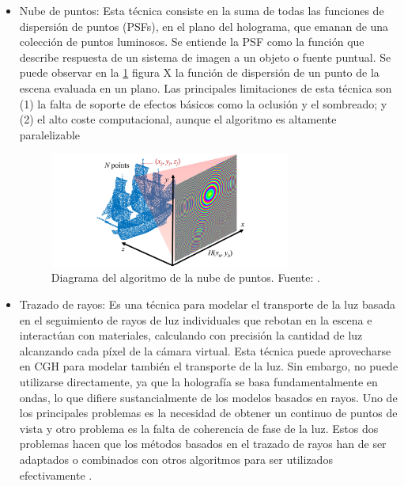\documentclass[10pt, a4paper]{article}
\begin{document}
\begin{itemize}
\item Nube de puntos: Esta técnica consiste en la suma de todas las funciones de dispersión de puntos (PSFs), en el plano del holograma, que emanan de una colección de puntos luminosos. Se entiende la PSF como la función que describe respuesta de un sistema de imagen a un objeto o fuente puntual. Se puede observar en la \ref{fig:nube} figura X la función de dispersión de un punto de la escena evaluada en un plano. Las principales limitaciones de esta técnica son (1) la falta de soporte de efectos básicos como la oclusión y el sombreado; y (2) el alto coste computacional, aunque el algoritmo es altamente paralelizable \cite{Blinder:2021}

\begin{figure}[h]
    \centering 
    \includegraphics[width=0.75\textwidth]{tecnica_nube_puntos}

    \caption{Diagrama del algoritmo de la nube de puntos. Fuente: \textcite{Blinder:2022}.}
    \label{fig:nube}
\end{figure}

\item Trazado de rayos: Es una técnica para modelar el transporte de la luz basada en el seguimiento de rayos de luz individuales que rebotan en la escena e interactúan con materiales, calculando con precisión la cantidad de luz alcanzando cada píxel de la cámara virtual. Esta técnica puede aprovecharse en CGH para modelar también el transporte de la luz. Sin embargo, no puede utilizarse directamente, ya que la holografía se basa fundamentalmente en ondas, lo que difiere sustancialmente de los modelos basados en rayos. Uno de los principales problemas es la necesidad de obtener un continuo de puntos de vista y otro problema es la falta de coherencia de fase de la luz. Estos dos problemas hacen que los métodos basados en el trazado de rayos han de ser adaptados o combinados con otros algoritmos para ser utilizados efectivamente \cite{Blinder:2022}.
\end{itemize}
\end{document}
